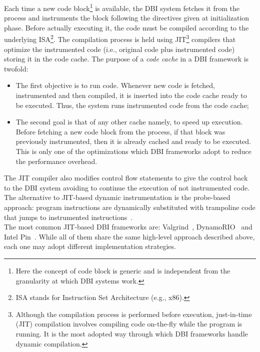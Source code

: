 \documentclass[LaM,binding=0.6cm]{sapthesis}
\begin{document}
Each time a new code block\footnote{Here the concept of code block is generic and is independent from the granularity at which DBI systems work.} is available, the DBI system fetches it from the process and instruments the block following the directives given at initialization phase. Before actually executing it, the code must be compiled according to the underlying ISA\footnote{ISA stands for Instruction Set Architecture (e.g., x$86$).}. The compilation process is held using JIT\footnote{Although the compilation process is performed before execution, just-in-time (JIT) compilation involves compiling code on-the-fly while the program is running. It is the most adopted way through which DBI frameworks handle dynamic compilation.} compilers that optimize the instrumented code (i.e., original code plus instrumented code) storing it in the code cache. The purpose of a \textit{code cache} in a DBI framework is twofold:
\begin{itemize}
\item The first objective is to run code. Whenever new code is fetched, instrumented and then compiled, it is inserted into the code cache ready to be executed. Thus, the system runs instrumented code from the code cache;
\item The second goal is that of any other cache namely, to speed up execution. Before fetching a new code block from the process, if that block was previously instrumented, then it is already cached and ready to be executed. This is only one of the optimizations which DBI frameworks adopt to reduce the performance overhead.
\end{itemize}
The JIT compiler also modifies control flow statements to give the control back to the DBI system avoiding to continue the execution of not instrumented code. The alternative to JIT-based dynamic instrumentation is the probe-based approach: program instructions are dynamically substituted with trampoline code that jumps to instrumented instructions~\cite{buck2000api}.\\
The most common JIT-based DBI frameworks are: Valgrind~\cite{nethercote2007valgrind}, DynamoRIO~\cite{bruening2012transparent} and Intel Pin~\cite{luk2005pin}. While all of them share the same high-level approach described above, each one may adopt different implementation strategies.
\end{document}
